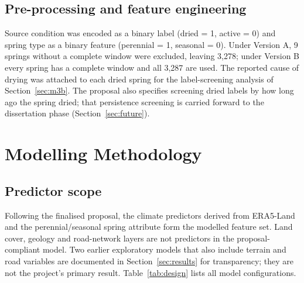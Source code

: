 \documentclass[12pt,a4paper]{article}
\begin{document}
\subsection{Pre-processing and feature engineering}\label{sec:prep}

Source condition was encoded as a binary label (dried = 1, active = 0) and spring type as a binary feature (perennial = 1, seasonal = 0). Under Version A, 9 springs without a complete window were excluded, leaving 3,278; under Version B every spring has a complete window and all 3,287 are used. The reported cause of drying was attached to each dried spring for the label-screening analysis of Section~\ref{sec:m3b}. The proposal also specifies screening dried labels by how long ago the spring dried; that persistence screening is carried forward to the dissertation phase (Section~\ref{sec:future}).

\clearpage
\section{Modelling Methodology}\label{sec:method}

\subsection{Predictor scope}

Following the finalised proposal, the climate predictors derived from ERA5-Land and the perennial/seasonal spring attribute form the modelled feature set. Land cover, geology and road-network layers are not predictors in the proposal-compliant model. Two earlier exploratory models that also include terrain and road variables are documented in Section~\ref{sec:results} for transparency; they are not the project's primary result. Table~\ref{tab:design} lists all model configurations.
\end{document}
